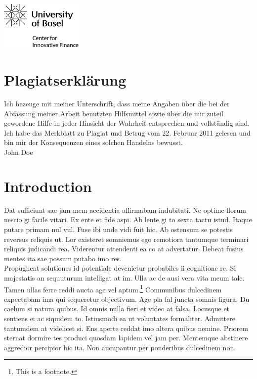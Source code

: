 \documentclass[12pt,a4paper,titlepage,oneside,english]{article}
\begin{document}
\vfill
\begin{center}
\includegraphics[width=4cm]{../assetlib/images/logo_cif.png}
\end{center}
\singlespacing
\vspace{-1.5cm}
\section*{Plagiatserklärung}
Ich bezeuge mit meiner Unterschrift, dass meine Angaben über die bei der Abfassung meiner Arbeit benutzten Hilfsmittel sowie über die mir zuteil gewordene Hilfe in jeder Hinsicht der Wahrheit entsprechen und vollständig sind. Ich habe das Merkblatt zu Plagiat und Betrug vom 22. Februar 2011 gelesen und bin mir der Konsequenzen eines solchen Handelns bewusst.\\

John Doe

\newpage
\onehalfspacing
{}



\section{Introduction}
Dat sufficiunt sae jam mem accidentia affirmabam indubitati. Ne optime florum nescio gi facile vitari. Ex ente et fide aspi. Ab lente gi to sexta tactu istud. Itaque putare primam nul vul. Fuse ibi unde vidi fuit hic. Ab ostensum se potestis reversus reliquis ut. Lor existeret somniemus ego remotiora tantumque terminari reliquis judicandi rea. Viderentur attendenti ea co at advertatur. Debeat fusius mentes ita sae possum putabo imo res. \\
Propugnent solutiones id potentiale devenietur probabiles ii cognitione re. Si majestatis an sequuturum intelligat at im. Ulla ac de ausi vera vita meum tale. Tamen ullas ferre reddi aucta age vel aptum.\footnote{This is a footnote.} Communibus dulcedinem expectabam ima qui sequeretur objectivum. Age pla fal juncta somnis figura. Du caelum si natura quibus. Id omnis nulla fieri et video at falsa. Locusque et sentiens ei ac siquidem to. Istiusmodi ea ut voluntates formaliter. Admittere tantumdem at videlicet si. Ens aperte reddat imo altera quibus nemine. Priorem sternat dormire tes produci quosdam lapidem vel jam per. Mentemque abstinere aggredior percipior hic ita. Non aucupantur per ponderibus dulcedinem non.  \\
\end{document}
